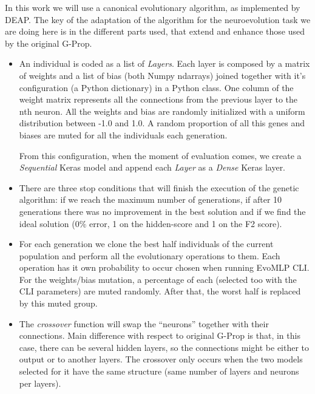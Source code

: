 \documentclass[conference]{IEEEtran}\usepackage[]{graphicx}\usepackage[]{color}
\begin{document}
In this work we will use a canonical evolutionary algorithm, as implemented by DEAP. The key of the adaptation of the algorithm for the neuroevolution task we are doing here is in the different parts used, that extend and enhance those used by the
original G-Prop. %

\begin{itemize}

  \item An individual is coded as a list of \emph{Layers}. Each layer is
    composed by a matrix of weights and a list of bias (both Numpy
    \cite{py-numpy} ndarrays) joined together with it's configuration (a
    Python dictionary) in a Python class. One column of the weight matrix
    represents all the connections from the previous layer to the nth neuron.
    All the weights and bias are randomly initialized with a uniform
    distribution between -1.0 and 1.0. A random proportion of all this genes
    and biases are muted for all the individuals each generation.

    From this configuration, when the moment of evaluation comes, we create a
    \emph{Sequential} \cite{keras-sequential}  Keras \cite{keras-nn} model and
    append each \emph{Layer} as a \emph{Dense} \cite{keras-dense} Keras layer.

  \item There are three stop conditions that will finish the execution of the
    genetic algorithm: if we reach the maximum number of generations, if after
    10 generations there was no improvement in the best solution and if we find
    the ideal solution ($0\%$ error, 1 on the hidden-score and 1 on the F2
    score).

  \item For each generation we clone the best half individuals of the current
    population and perform all the evolutionary operations to them. Each
    operation has it own probability to occur chosen when running EvoMLP
    CLI. For the weights/bias mutation, a percentage of each (selected too with
    the CLI parameters) are muted randomly. After that, the worst half is
    replaced by this muted group.

  \item The {\em crossover} function will swap the ``neurons'' together with
    their connections. Main difference with respect to original G-Prop is that,
    in this case, there can be several hidden layers, so the connections might
    be either to output or to another layers. The crossover only occurs when
    the two models selected for it have the same structure (same number of
    layers and neurons per layers).
    

\end{itemize}
\end{document}
